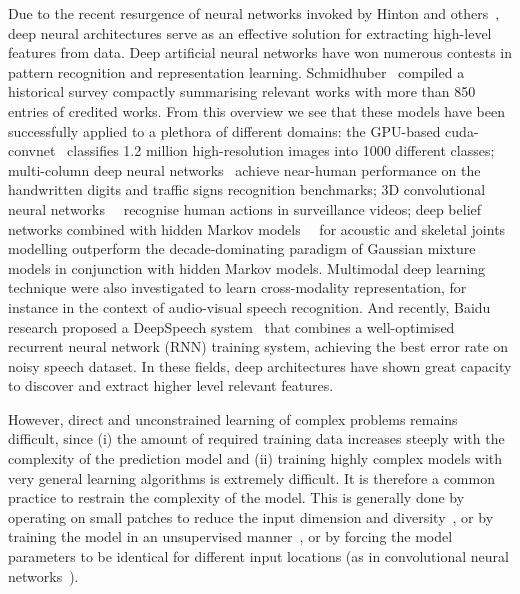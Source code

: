 Due to the recent resurgence of neural networks invoked by Hinton and others~\cite{hinton2006fast},
deep neural architectures serve as an effective solution for extracting high-level features from data.
Deep artificial neural networks have won numerous contests in pattern recognition and representation learning.
Schmidhuber~\cite{schmidhuber2014deep} compiled a historical survey compactly summarising relevant works with more than 850 entries of credited works.
From this overview we see that these models have been successfully applied to a plethora of different domains: the GPU-based cuda-convnet~\cite{krizhevsky2012imagenet} classifies 1.2 million high-resolution images into 1000 different classes; multi-column deep neural networks~\cite{ciresan2012multi} achieve near-human performance on the handwritten digits and traffic signs recognition benchmarks; 3D convolutional neural networks~\cite{3dcnn}~\cite{ji20133d} recognise human actions in surveillance videos; deep belief networks combined with hidden Markov models~\cite{mohamed2012acoustic}~\cite{diwucvpr14} for acoustic and skeletal joints modelling outperform the decade-dominating paradigm of Gaussian mixture models in conjunction with hidden Markov models.
%
Multimodal deep learning technique were also investigated \cite{Ngiam2011multimodal} to learn cross-modality representation,
for instance in the context of audio-visual speech recognition.
%
And recently, Baidu research proposed a DeepSpeech system~\cite{hannun2014deepspeech} that combines a well-optimised recurrent neural network (RNN) training system, achieving the best error rate on noisy speech dataset. In these fields, deep architectures have shown great capacity to discover and extract higher level relevant features.

However, direct and unconstrained learning of complex problems remains difficult, since (i) the amount of required training data increases steeply with the complexity of the prediction model and (ii) training highly complex models with very general learning algorithms is extremely difficult. It is therefore a common practice to restrain the complexity of the model. This is generally done by operating on small patches to reduce the input dimension and diversity~\cite{baccouche2005spatio}, or by training the model in an unsupervised manner~\cite{le2011learning}, or by forcing the model parameters to be identical for different input locations (as in convolutional neural networks~\cite{krizhevsky2012imagenet,ciresan2012multi,3dcnn}).


